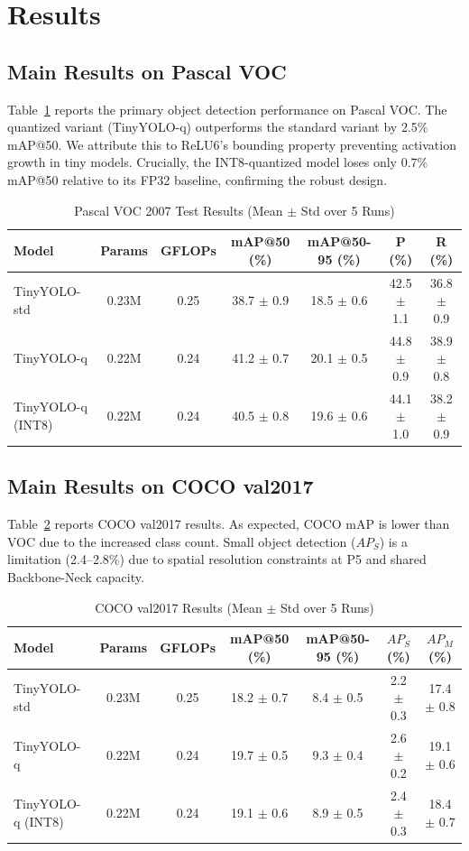 \documentclass[article,submit,moreauthors,pdftex,10pt,a4paper]{article}
\begin{document}
\section{Results}

\subsection{Main Results on Pascal VOC}
Table~\ref{tab:voc_results} reports the primary object detection performance on Pascal VOC. The quantized variant (TinyYOLO-q) outperforms the standard variant by 2.5\% mAP@50. We attribute this to ReLU6's bounding property preventing activation growth in tiny models. Crucially, the INT8-quantized model loses only 0.7\% mAP@50 relative to its FP32 baseline, confirming the robust design.

\begin{table}[h]
\centering
\caption{Pascal VOC 2007 Test Results (Mean $\pm$ Std over 5 Runs)}
\label{tab:voc_results}
\begin{tabular}{lcccccc}
\toprule
Model & Params & GFLOPs & mAP@50 (\%) & mAP@50-95 (\%) & P (\%) & R (\%) \\
\midrule
TinyYOLO-std & 0.23M & 0.25 & 38.7 $\pm$ 0.9 & 18.5 $\pm$ 0.6 & 42.5 $\pm$ 1.1 & 36.8 $\pm$ 0.9 \\
TinyYOLO-q & 0.22M & 0.24 & 41.2 $\pm$ 0.7 & 20.1 $\pm$ 0.5 & 44.8 $\pm$ 0.9 & 38.9 $\pm$ 0.8 \\
TinyYOLO-q (INT8) & 0.22M & 0.24 & 40.5 $\pm$ 0.8 & 19.6 $\pm$ 0.6 & 44.1 $\pm$ 1.0 & 38.2 $\pm$ 0.9 \\
\bottomrule
\end{tabular}
\end{table}

\subsection{Main Results on COCO val2017}
Table~\ref{tab:coco_results} reports COCO val2017 results. As expected, COCO mAP is lower than VOC due to the increased class count. Small object detection ($AP_S$) is a limitation (2.4--2.8\%) due to spatial resolution constraints at P5 and shared Backbone-Neck capacity.

\begin{table}[h]
\centering
\caption{COCO val2017 Results (Mean $\pm$ Std over 5 Runs)}
\label{tab:coco_results}
\begin{tabular}{lcccccc}
\toprule
Model & Params & GFLOPs & mAP@50 (\%) & mAP@50-95 (\%) & $AP_S$ (\%) & $AP_M$ (\%) \\
\midrule
TinyYOLO-std & 0.23M & 0.25 & 18.2 $\pm$ 0.7 & 8.4 $\pm$ 0.5 & 2.2 $\pm$ 0.3 & 17.4 $\pm$ 0.8 \\
TinyYOLO-q & 0.22M & 0.24 & 19.7 $\pm$ 0.5 & 9.3 $\pm$ 0.4 & 2.6 $\pm$ 0.2 & 19.1 $\pm$ 0.6 \\
TinyYOLO-q (INT8) & 0.22M & 0.24 & 19.1 $\pm$ 0.6 & 8.9 $\pm$ 0.5 & 2.4 $\pm$ 0.3 & 18.4 $\pm$ 0.7 \\
\bottomrule
\end{tabular}
\end{table}
\end{document}
